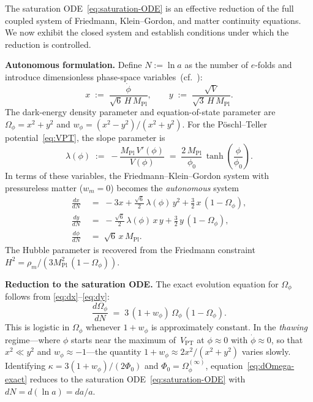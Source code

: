 \documentclass[12pt,a4paper]{article}
\theoremstyle{definition}
\theoremstyle{plain}
\theoremstyle{remark}
\begin{document}
The saturation ODE~\eqref{eq:saturation-ODE} is an effective reduction of
the full coupled system of Friedmann, Klein--Gordon, and matter continuity
equations.  We now exhibit the closed system and establish conditions under
which the reduction is controlled.

\medskip
\noindent\textbf{Autonomous formulation.}\;
Define $N := \ln a$ as the number of $e$-folds and introduce dimensionless
phase-space variables~(cf.~\cite{CopelandLiddleWands1998}):
\begin{equation}\label{eq:xy-def}
  x \;:=\; \frac{\dot\phi}{\sqrt{6}\,H\,M_{\mathrm{Pl}}},
  \qquad
  y \;:=\; \frac{\sqrt{V}}{\sqrt{3}\,H\,M_{\mathrm{Pl}}}.
\end{equation}
The dark-energy density parameter and equation-of-state parameter are
$\Omega_\phi = x^2 + y^2$ and $w_\phi = (x^2 - y^2)/(x^2 + y^2)$.
For the P\"oschl--Teller potential~\eqref{eq:VPT}, the slope parameter is
\begin{equation}\label{eq:lambda-PT}
  \lambda(\phi) \;:=\;
  -\frac{M_{\mathrm{Pl}}\,V'(\phi)}{V(\phi)}
  \;=\; \frac{2\,M_{\mathrm{Pl}}}{\phi_0}\,
  \tanh\!\left(\frac{\phi}{\phi_0}\right).
\end{equation}
In terms of these variables, the Friedmann--Klein--Gordon system with
pressureless matter ($w_m = 0$) becomes the \emph{autonomous} system
\begin{align}
  \frac{dx}{dN} &\;=\;
    -3x + \frac{\sqrt{6}}{2}\,\lambda(\phi)\,y^2
    + \frac{3}{2}\,x\,(1 - \Omega_\phi),
    \label{eq:dx}\\[4pt]
  \frac{dy}{dN} &\;=\;
    -\frac{\sqrt{6}}{2}\,\lambda(\phi)\,x\,y
    + \frac{3}{2}\,y\,(1 - \Omega_\phi),
    \label{eq:dy}\\[4pt]
  \frac{d\phi}{dN} &\;=\; \sqrt{6}\,x\,M_{\mathrm{Pl}}.
    \label{eq:dphi}
\end{align}
The Hubble parameter is recovered from the Friedmann constraint
$H^2 = \rho_m/(3M_{\mathrm{Pl}}^2\,(1 - \Omega_\phi))$.

\medskip
\noindent\textbf{Reduction to the saturation ODE.}\;
The exact evolution equation for $\Omega_\phi$ follows from
\eqref{eq:dx}--\eqref{eq:dy}:
\begin{equation}\label{eq:dOmega-exact}
  \frac{d\Omega_\phi}{dN}
  \;=\; 3\,(1 + w_\phi)\,\Omega_\phi\,(1 - \Omega_\phi).
\end{equation}
This is logistic in $\Omega_\phi$ whenever $1 + w_\phi$ is approximately
constant.  In the \emph{thawing} regime---where $\phi$ starts near the
maximum of~$V_{\mathrm{PT}}$ at $\phi \approx 0$ with $\dot\phi \approx 0$,
so that $x^2 \ll y^2$ and $w_\phi \approx -1$---the quantity
$1 + w_\phi \approx 2x^2/(x^2 + y^2)$ varies slowly.  Identifying
$\kappa = 3(1 + w_\phi)/(2\Phi_0)$ and $\Phi_0 = \Omega_\phi^{(\infty)}$,
equation~\eqref{eq:dOmega-exact} reduces to the saturation
ODE~\eqref{eq:saturation-ODE} with $dN = d(\ln a) = da/a$.
\end{document}

